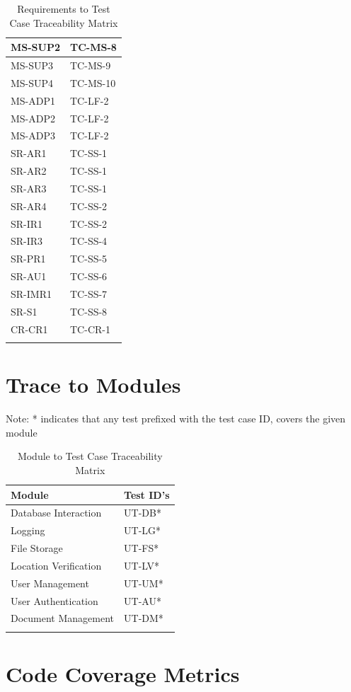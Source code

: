 \documentclass[12pt, titlepage]{article}
\begin{document}
\begin{longtable}{|l|l|}
  MS-SUP2 & TC-MS-8 \\ \hline
  MS-SUP3 & TC-MS-9 \\ \hline
  MS-SUP4 & TC-MS-10 \\ \hline
  MS-ADP1 & TC-LF-2 \\ \hline
  MS-ADP2 & TC-LF-2 \\ \hline
  MS-ADP3 & TC-LF-2 \\ \hline
  SR-AR1 & TC-SS-1 \\ \hline
  SR-AR2 & TC-SS-1 \\ \hline
  SR-AR3 & TC-SS-1 \\ \hline
  SR-AR4 & TC-SS-2 \\ \hline
  SR-IR1 & TC-SS-2 \\ \hline
  SR-IR3 & TC-SS-4 \\ \hline
  SR-PR1 & TC-SS-5\\ \hline
  SR-AU1 & TC-SS-6 \\ \hline
  SR-IMR1 & TC-SS-7 \\ \hline
  SR-S1 & TC-SS-8 \\ \hline
  CR-CR1 & TC-CR-1 \\ \hline
  \caption{Requirements to Test Case Traceability Matrix}
\end{longtable}

\section{Trace to Modules}

Note: * indicates that any test prefixed with the test case ID,
covers the given module

\begin{longtable}{|l|l|}
  \hline
  \textbf{Module} & \textbf{Test ID's} \\
  \hline
  Database Interaction & UT-DB*\\ \hline
  Logging & UT-LG*\\ \hline
  File Storage & UT-FS*\\ \hline
  Location Verification & UT-LV*\\ \hline
  User Management & UT-UM*\\ \hline
  User Authentication & UT-AU*\\ \hline
  Document Management & UT-DM*\\ \hline
  \caption{Module to Test Case Traceability Matrix}
\end{longtable}

\section{Code Coverage Metrics}
\end{document}
